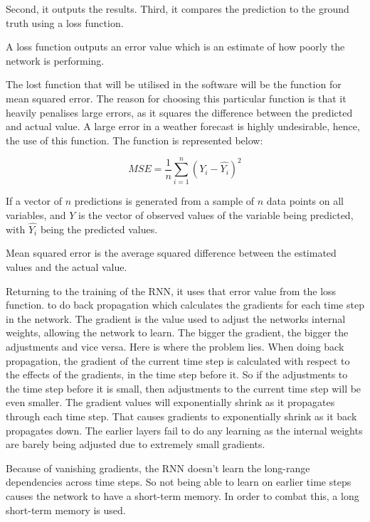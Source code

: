 Second, it outputs the results. Third, it compares the prediction to the ground truth using a loss function.

\begin{definition}
A loss function outputs an error value which is an estimate of how poorly the network is performing.
\end{definition}

The lost function that will be utilised in the software will be the function for mean squared error. The reason for choosing this particular function is that it heavily penalises large errors, as it squares the difference between the predicted and actual value. A large error in a weather forecast is highly undesirable, hence, the use of this function. The function is represented below:

\begin{equation}
    MSE = \frac{1}{n}\sum_{i=1}^n(Y_i-\hat{Y_i})^2
\end{equation}

If  a vector of $n$ predictions is generated from a sample of $n$ data points on all variables, and $Y$ is the vector of observed values of the variable being predicted, with $\hat{Y_i}$ being the predicted values.

\begin{definition}
Mean squared error is the average squared difference between the estimated values and the actual value.
\end{definition}

Returning to the training of the RNN, it uses that error value from the loss function. to do back propagation which calculates the gradients for each time step in the network. The gradient is the value used to adjust the networks internal weights, allowing the network to learn. The bigger the gradient, the bigger the adjustments and vice versa. Here is where the problem lies. When doing back propagation, the gradient of the current time step is calculated with respect to the effects of the gradients, in the time step before it. So if the adjustments to the time step before it is small, then adjustments to the current time step will be even smaller.  The gradient values will exponentially shrink as it propagates through each time step. That causes gradients to exponentially shrink as it back propagates down. The earlier layers fail to do any learning as the internal weights are barely being adjusted due to extremely small gradients.

Because of vanishing gradients, the RNN doesn’t learn the long-range dependencies across time steps. So not being able to learn on earlier time steps causes the network to have a short-term memory. In order to combat this, a long short-term memory is used\cite{intro_rnn}.

